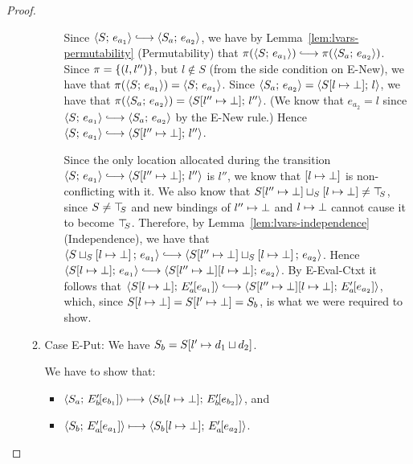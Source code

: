 \begin{proof}
\begin{enumerate}
\begin{enumerate}
\begin{itemize}
          Since $\config{S}{e_{a_1}} \parstepsto
          \config{S_a}{e_{a_2}}$, we have by
          Lemma~\ref{lem:lvars-permutability} (Permutability) that
          $\pi(\config{S}{e_{a_1}}) \parstepsto
          \pi(\config{S_a}{e_{a_2}})$.  Since $\pi = \left\{(l,
            l'')\right\}$, but $l \notin S$ (from the side condition on {\sc
            E-New}), we have that $\pi(\langle S;\, e_{a_1} \rangle) =
          \langle S;\, e_{a_1} \rangle$. Since $\langle S_a;\, e_{a_2} \rangle =
          \langle S[l \mapsto \bot];\, l \rangle$, we have that
          $\pi(\langle S_a;\, e_{a_2} \rangle) =
          \langle S[l'' \mapsto \bot];\, l'' \rangle$.  (We know that
          $e_{a_2} = l$ since $\config{S}{e_{a_1}} \parstepsto
          \config{S_a}{e_{a_2}}$ by the {\sc E-New} rule.)  Hence
          $\config{S}{e_{a_1}} \parstepsto
          \config{\extSRaw{S}{l''}{\bot}}{l''}$.

          Since the only location allocated during the transition
          $\config{S}{e_{a_1}} \parstepsto
          \config{\extSRaw{S}{l''}{\bot}}{l''}$ is $l''$, we know that
          $\left[ l \mapsto \bot \right]$ is non-conflicting with
          it.  We also know that
          $S[l'' \mapsto \bot] \sqcup_{S} \left[ l \mapsto \bot \right]
          \neq \top\hspace{-0.85mm}_{S}$, since $S \neq \top\hspace{-0.85mm}_{S}$ and new bindings of
          $l'' \mapsto \bot$ and
          $l \mapsto \bot$ cannot cause it to become
          $\top\hspace{-0.85mm}_{S}$.  Therefore, by Lemma~\ref{lem:lvars-independence}
          (Independence), we have that
          $\config{\lubstore{S}{\store{\storebindingRaw{l}{\bot}}}}{e_{a_1}}
          \parstepsto
          \config{\lubstore{\extSRaw{S}{l''}{\bot}}{\store{\storebindingRaw{l}{\bot}}}}{e_{a_2}}$.
          Hence $\config{\extSRaw{S}{l}{\bot}}{e_{a_1}} \parstepsto
          \config{\extSRaw{\extSRaw{S}{l''}{\bot}}{l}{\bot}}{e_{a_2}}$.
          By {\sc E-Eval-Ctxt} it follows that
          $\config{\extSRaw{S}{l}{\bot}}{\evalctxt{E'_a}{e_{a_1}}}
          \parstepsto
          \config{\extSRaw{\extSRaw{S}{l''}{\bot}}{l}{\bot}}{\evalctxt{E'_a}{e_{a_2}}}$,
          which, since $S[l \mapsto \bot] = S[l' \mapsto \bot] =
          S_b$, is what we were required to show.

      \end{itemize}

    \item \label{lvars-slc-new-put}Case {\sc E-Put}: We have $S_b =
      S[l' \mapsto d_1 \sqcup d_2]$.

      We have to show that:
      \begin{itemize}
      \item $\langle S_a;\, E'_b\hspace{-1mm}\left[e_{b_1}\right] \rangle \longmapsto
        \langle S_b[l \mapsto \bot];\, E'_b\hspace{-1mm}\left[e_{b_2}\right] \rangle$,
        and
      \item
        $\langle S_b;\, E'_a\hspace{-1mm}\left[e_{a_1}\right] \rangle \longmapsto
        \langle S_b[l \mapsto \bot];\, E'_a\hspace{-1mm}\left[e_{a_2}\right] \rangle$.
      \end{itemize}


\end{enumerate}
\end{enumerate}
\end{proof}
